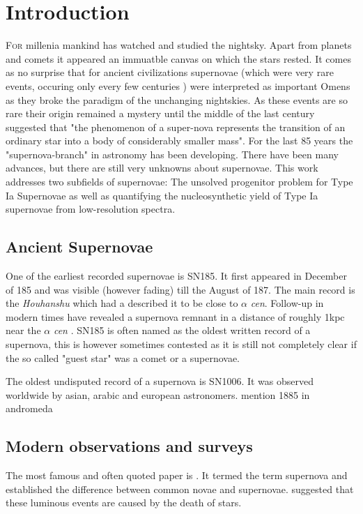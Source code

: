 \chapter{Introduction}
\label{chap:intro}

\lettrine[lines=4]{F}{or} millenia mankind has watched and studied the nightsky. Apart from planets and comets it appeared an immuatble canvas on which the stars rested. It comes as no surprise that for ancient civilizations supernovae (which were very rare events, occuring only every few centuries ) were interpreted as important Omens as they broke the paradigm of the unchanging nightskies. As these events are so rare their origin remained a mystery until the middle of the last century \citet{1934PNAS...20..254B} suggested that "the phenomenon of a super-nova represents the transition of an ordinary star into a body of considerably smaller mass". For the last 85 years the "supernova-branch" in astronomy has been developing. There have been many advances, but there are still very unknowns about supernovae. This work addresses two subfields of supernovae: The unsolved progenitor problem for Type Ia Supernovae as well as quantifying the nucleosynthetic yield of Type Ia supernovae from low-resolution spectra.


\section{Ancient Supernovae}
\label{sec:ancientsn}

One of the earliest recorded supernovae is SN185. It first appeared in December of 185 and was visible (however fading) till the August of 187. The main record is the \textit{Houhanshu} \citep{2006ChJAA...6..635Z} which had a described it to be close to $\alpha$ \textit{cen}. Follow-up in modern times have revealed a supernova remnant in a distance of roughly 1\;kpc near the $\alpha$ \textit{cen} \citep{2006ChJAA...6..635Z}. SN185 is often named as the oldest written record of a supernova, this is however sometimes contested as it is still not completely clear if the so called "guest star" was a comet or a supernovae. 

The oldest undisputed record of a supernova is SN1006. It was observed worldwide by asian, arabic and european astronomers. 
mention 1885 in andromeda\cite{1885AN....112..360H}


\section{Modern observations and surveys}
\label{sec:}
The most famous and often quoted paper is \citet{1934PNAS...20..254B}. It termed the term supernova and established the difference between common novae and supernovae. \citet{1934PNAS...20..254B} suggested that these luminous events are caused by the death of stars. 

